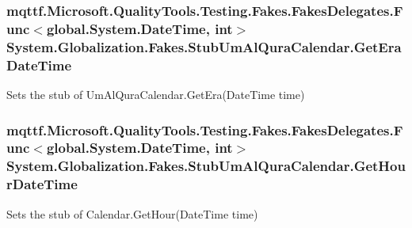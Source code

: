 \hypertarget{class_system_1_1_globalization_1_1_fakes_1_1_stub_um_al_qura_calendar_a568eefa353c0e71f40d6b3fc3ca425b8}{
\subsubsection[{Get\-Era\-Date\-Time}]{\setlength{\rightskip}{0pt plus 5cm}mqttf.\-Microsoft.\-Quality\-Tools.\-Testing.\-Fakes.\-Fakes\-Delegates.\-Func$<$global.\-System.\-Date\-Time, int$>$ System.\-Globalization.\-Fakes.\-Stub\-Um\-Al\-Qura\-Calendar.\-Get\-Era\-Date\-Time}}\label{class_system_1_1_globalization_1_1_fakes_1_1_stub_um_al_qura_calendar_a568eefa353c0e71f40d6b3fc3ca425b8}


Sets the stub of Um\-Al\-Qura\-Calendar.\-Get\-Era(\-Date\-Time time)

\hypertarget{class_system_1_1_globalization_1_1_fakes_1_1_stub_um_al_qura_calendar_a1dd8ff1599bd0a91083bc9603ee79863}{
\subsubsection[{Get\-Hour\-Date\-Time}]{\setlength{\rightskip}{0pt plus 5cm}mqttf.\-Microsoft.\-Quality\-Tools.\-Testing.\-Fakes.\-Fakes\-Delegates.\-Func$<$global.\-System.\-Date\-Time, int$>$ System.\-Globalization.\-Fakes.\-Stub\-Um\-Al\-Qura\-Calendar.\-Get\-Hour\-Date\-Time}}\label{class_system_1_1_globalization_1_1_fakes_1_1_stub_um_al_qura_calendar_a1dd8ff1599bd0a91083bc9603ee79863}


Sets the stub of Calendar.\-Get\-Hour(\-Date\-Time time)

